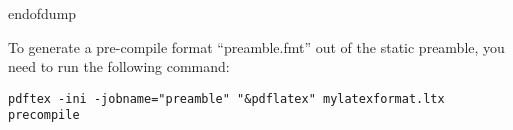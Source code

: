 
\csname endofdump\endcsname



\usepackage{verbatim}




\noindent
To generate a pre-compile format ``preamble.fmt'' out of the static preamble, you need to run the following command:

\begin{verbatim}
pdftex -ini -jobname="preamble" "&pdflatex" mylatexformat.ltx precompile
\end{verbatim}

